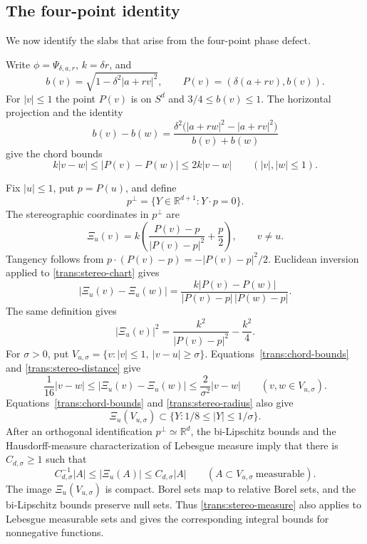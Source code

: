 \documentclass[11pt]{article}
\numberwithin{equation}{section}
\newcommand{\R}{\mathbb{R}}
\begin{document}
\subsection{The four-point identity}

We now identify the slabs that arise from the four-point phase defect.

Write \(\phi=\Psi_{\delta,a,r}\), \(k=\delta r\), and
\[
 b(v)=\sqrt{1-\delta^2|a+rv|^2},\qquad
 P(v)=(\delta(a+rv),b(v)).
\]
For \(|v|\leq1\) the point \(P(v)\) is on \(S^d\) and
\(3/4\leq b(v)\leq1\). The horizontal projection and the
identity
\[
 b(v)-b(w)
 =\frac{\delta^2\bigl(|a+rw|^2-|a+rv|^2\bigr)}{b(v)+b(w)}
\]
give the chord bounds
\begin{equation}\label{trans:chord-bounds}
 k|v-w|\leq |P(v)-P(w)|\leq2k|v-w|
 \qquad (|v|,|w|\leq1).
\end{equation}

Fix \(|u|\leq1\), put \(p=P(u)\), and define
\[
 p^\perp=\{Y\in\R^{d+1}:Y\cdot p=0\}.
\]
The stereographic coordinates in \(p^\perp\) are
\begin{equation}\label{trans:stereo-chart}
 \Xi_u(v)
   =k\left(\frac{P(v)-p}{|P(v)-p|^2}+\frac p2\right),
   \qquad v\ne u.
\end{equation}
Tangency follows from
\(p\cdot(P(v)-p)=-|P(v)-p|^2/2\). Euclidean inversion applied to
\eqref{trans:stereo-chart} gives
\begin{equation}\label{trans:stereo-distance}
 |\Xi_u(v)-\Xi_u(w)|
 =\frac{k|P(v)-P(w)|}{|P(v)-p|\,|P(w)-p|}.
\end{equation}
The same definition gives
\begin{equation}\label{trans:stereo-radius}
 |\Xi_u(v)|^2=\frac{k^2}{|P(v)-p|^2}-\frac{k^2}{4}.
\end{equation}
For \(\sigma>0\), put
\(V_{u,\sigma}=\{v:|v|\leq1,\ |v-u|\geq\sigma\}\).
Equations~\eqref{trans:chord-bounds} and \eqref{trans:stereo-distance}
give
\[
 \frac1{16}|v-w|
 \leq|\Xi_u(v)-\Xi_u(w)|
 \leq\frac2{\sigma^2}|v-w|
 \qquad(v,w\in V_{u,\sigma}).
\]
Equations~\eqref{trans:chord-bounds} and \eqref{trans:stereo-radius}
also give
\[
 \Xi_u(V_{u,\sigma})\subset\{Y:1/8\leq|Y|\leq1/\sigma\}.
\]
After an orthogonal identification \(p^\perp\simeq\R^d\), the
bi-Lipschitz bounds and the Hausdorff-measure characterization of
Lebesgue measure imply that there is \(C_{d,\sigma}\geq1\) such that
\begin{equation}\label{trans:stereo-measure}
 C_{d,\sigma}^{-1}|A|\leq|\Xi_u(A)|\leq C_{d,\sigma}|A|
 \qquad(A\subset V_{u,\sigma}\ \text{measurable}).
\end{equation}
The image \(\Xi_u(V_{u,\sigma})\) is compact. Borel sets map to
relative Borel sets, and the bi-Lipschitz bounds preserve null sets.
Thus \eqref{trans:stereo-measure} also applies to Lebesgue measurable
sets and gives the corresponding integral bounds for nonnegative
functions.
\end{document}
